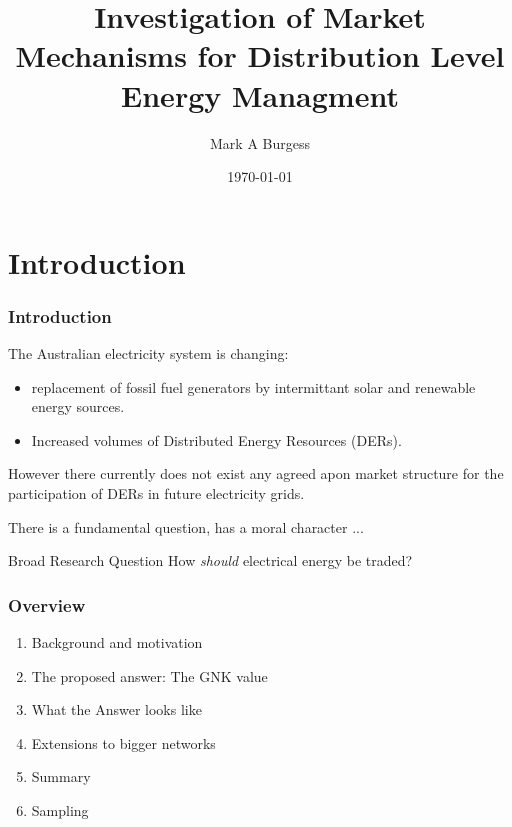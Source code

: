 \documentclass{beamer}
\title[An investigation of Market Mechanisms]{Investigation of Market Mechanisms for Distribution Level Energy Managment} %
\author{Mark A Burgess} %
\institute[ANU] %
{
Australian National University \\ %
\medskip
\textit{mark.burgess@anu.edu.au} %
}
\date{\today} %
\begin{document}
\begin{frame}
\titlepage %
\end{frame}





\section{Introduction}

\begin{frame}
\frametitle{Introduction}
The Australian electricity system is changing:
\begin{itemize}
\item	replacement of fossil fuel generators by intermittant solar and renewable energy sources.
\item	Increased volumes of Distributed Energy Resources (DERs).
\end{itemize}
However there currently does not exist any agreed apon market structure for the participation of DERs in future electricity grids.

There is a fundamental question, has a moral character ...
\begin{block}{Broad Research Question}
How \textit{should} electrical energy be traded?
\end{block}
\end{frame}


\begin{frame}
\frametitle{Overview}
\begin{enumerate}
\item	Background and motivation
\item	The proposed answer: The GNK value
\item	What the Answer looks like
\item	Extensions to bigger networks
\item	Summary
\item	Sampling
\end{enumerate}
\end{frame}
\end{document}
